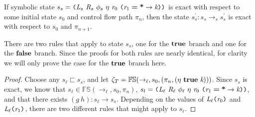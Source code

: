 \begin{lemma}
If symbolic state $s_s =  \lp \cfgnt{L}_s\ \cfgnt{R}_s\ \phi_s\ \eta\ \cfgnt{r}_0\ \lp \cfgnt{r}_1\; \cfgt{=}\; \cfgt{*} \rightarrow \cfgnt{k}\rp \rp$ is exact with respect to some initial state $s_0$ and control flow path $\pi_n$, then the state $s_s^\prime : s_s \rightarrow_s s_s^\prime$ is exact with respect to $s_0$ and $\pi_{n+1}$.
\end{lemma}
There are two rules that apply to state $s_s$, one for the $\textbf{true}$ branch and one for the $\textbf{false}$ branch. Since the proofs for both rules are nearly identical, for clarity we will only prove the case for the $\textbf{true}$ branch here. 
\begin{proof}
Choose any $s_\ell \sqsubset s_s$, and let $\zeta_T = \mathbb{FS}(\rightarrow_{\ell},s_0,(\pi_n,(\eta\ \cfgt{true}\ \cfgnt{k})))$. Since $s_s$ is exact, we know that $s_\ell \in \mathbb{FS}(\rightarrow_{\ell},s_0,\pi_n)$, $s_l = \lp \cfgnt{L}_\ell\ \cfgnt{R}_\ell\ \phi_\ell\ \eta\ \cfgnt{r}_0\ \lp \cfgnt{r}_1\; \cfgt{=}\; \cfgt{*} \rightarrow \cfgnt{k}\rp \rp$, and that there exists $(g\ h) : s_\ell \rightarrow s_s$. 
Depending on the values of $\emph{L}_\ell \texttt{(} \emph{r}_0\texttt{)}$ and $\emph{L}_\ell \texttt{(} \emph{r}_1 \texttt{)}$, there are two different rules that might apply to $s_\ell$.


\end{proof}
